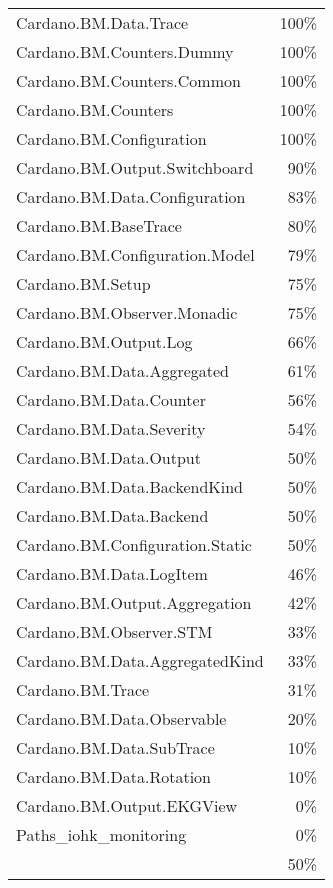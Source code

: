 \begin{tabular}{l r}
   Cardano.BM.Data.Trace & 100\% \\
   Cardano.BM.Counters.Dummy & 100\% \\
   Cardano.BM.Counters.Common & 100\% \\
   Cardano.BM.Counters & 100\% \\
   Cardano.BM.Configuration & 100\% \\
   Cardano.BM.Output.Switchboard & 90\% \\
   Cardano.BM.Data.Configuration & 83\% \\
   Cardano.BM.BaseTrace & 80\% \\
   Cardano.BM.Configuration.Model & 79\% \\
   Cardano.BM.Setup & 75\% \\
   Cardano.BM.Observer.Monadic & 75\% \\
   Cardano.BM.Output.Log & 66\% \\
   Cardano.BM.Data.Aggregated & 61\% \\
   Cardano.BM.Data.Counter & 56\% \\
   Cardano.BM.Data.Severity & 54\% \\
   Cardano.BM.Data.Output & 50\% \\
   Cardano.BM.Data.BackendKind & 50\% \\
   Cardano.BM.Data.Backend & 50\% \\
   Cardano.BM.Configuration.Static & 50\% \\
   Cardano.BM.Data.LogItem & 46\% \\
   Cardano.BM.Output.Aggregation & 42\% \\
   Cardano.BM.Observer.STM & 33\% \\
   Cardano.BM.Data.AggregatedKind & 33\% \\
   Cardano.BM.Trace & 31\% \\
   Cardano.BM.Data.Observable & 20\% \\
   Cardano.BM.Data.SubTrace & 10\% \\
   Cardano.BM.Data.Rotation & 10\% \\
   Cardano.BM.Output.EKGView & 0\% \\
   Paths\_iohk\_monitoring & 0\% \\
    & 50\% \\
\end{tabular}
